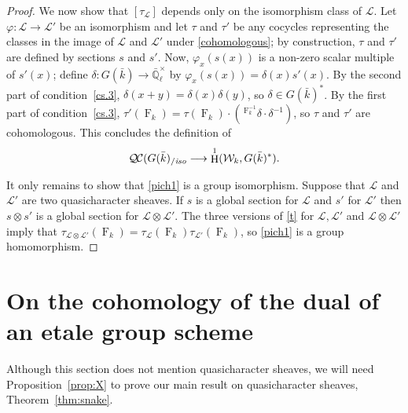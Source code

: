 \documentclass[11pt]{amsart}
\theoremstyle{plain}
\theoremstyle{definition}
\theoremstyle{remark}
\newcommand{\EE}{\mathbb{\bar Q}_\ell}
\newcommand{\bFq}{\bar{k}}
\newcommand{\Fq}{k}
\newcommand{\EEx}{\EE^\times}
\newcommand{\Frob}[1]{\operatorname{F}_{#1}}
\DeclareMathOperator{\Hom}{Hom}
\DeclareMathOperator{\Hh}{H}
\newcommand{\cs}[1]{{\mathcal{#1}}}
\newcommand{\QC}{{\mathcal{Q\hskip-0.8pt C}}}
\newcommand{\QCiso}[1]{\QC(#1)_{/\textit{iso}}}
\newcommand{\Weil}[1]{\mathcal{W}_{#1}}
\newcommand\Clifton[1]{\marginpar{\smaller\smaller CC: #1}}
\begin{document}
\begin{proof}
  We now show that $[\tau_\cs{L}]$ depends only on the isomorphism class of $\cs{L}$.
  Let $\varphi : \cs{L} \to \cs{L'}$ be an isomorphism and
  let $\tau$ and $\tau'$ be any cocycles representing the classes in the
  image of $\cs{L}$ and $\cs{L'}$ under \eqref{cohomologous}; by construction,
  $\tau$ and $\tau'$ are defined by sections $s$ and $s'$. Now, $\varphi_x(s(x))$ is a
  non-zero scalar multiple of $s'(x)$; define $\delta: G(\bFq) \to \EEx$
  by $\varphi_x(s(x)) = \delta(x) s'(x)$.
  By the second part of condition~\ref{cs.3},
  $\delta(x+y) = \delta(x)\delta(y)$, so $\delta \in G(\bFq)^*$. By the first part of
  condition~\ref{cs.3}, $\tau'(\Frob{\Fq}) = \tau(\Frob{\Fq}) \cdot (\,^{\Frob{\Fq}^{-1}}\delta \cdot \delta^{-1})$,
  so $\tau$ and $\tau'$ are cohomologous. This concludes the definition of
  \begin{equation}\label{pich1}
    \QCiso{G(\bFq} \longrightarrow \Hh^1(\Weil{\Fq},G(\bFq)^*).
  \end{equation}

  It only remains to show that \eqref{pich1} is a group
  isomorphism.  Suppose that $\cs{L}$ and $\cs{L}'$ are two quasicharacter sheaves.
  If $s$ is a global section for $\cs{L}$ and $s'$ for $\cs{L}'$ then $s \otimes s'$ is a global section for
  $\cs{L} \otimes \cs{L}'$.  The three versions of \eqref{t} for $\cs{L}, \cs{L'}$ and $\cs{L} \otimes \cs{L}'$ imply that
  $\tau_{\cs{L} \otimes \cs{L}'}(\Frob{k}) = \tau_\cs{L}(\Frob{k}) \tau_{\cs{L}'}(\Frob{k})$, so \eqref{pich1} is a group homomorphism.
\Clifton{I'm working on this.}
\end{proof}


\section{On the cohomology of the dual of an etale group scheme} \label{sec:etalecohom}
%

Although this section does not mention quasicharacter sheaves, 
we will need Proposition~\ref{prop:X} to prove our main result on quasicharacter sheaves, 
Theorem~\ref{thm:snake}.
\end{document}
